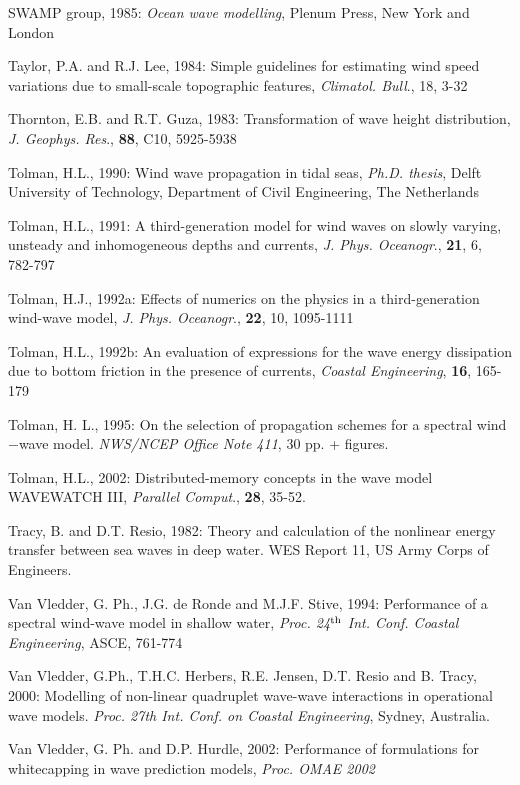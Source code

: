 \documentclass[12pt]{book}
\begin{document}
\begin{thebibliography}{10}
SWAMP group, 1985: {\it Ocean wave modelling}, Plenum Press, New York and London

Taylor, P.A. and R.J. Lee, 1984: Simple guidelines for estimating wind speed variations due to small-scale
topographic features, {\it Climatol. Bull}., 18, 3-32

Thornton, E.B. and R.T. Guza, 1983: Transformation of wave height distribution, {\it J. Geophys. Res}., {\bf 88},
C10, 5925-5938

Tolman, H.L., 1990: Wind wave propagation in tidal seas, {\it Ph.D. thesis}, Delft University of Technology,
Department of Civil Engineering, The Netherlands

Tolman, H.L., 1991: A third-generation model for wind waves on slowly varying, unsteady and
inhomogeneous depths and currents, {\it J. Phys. Oceanogr}., {\bf 21}, 6, 782-797

Tolman, H.J., 1992a: Effects of numerics on the physics in a third-generation wind-wave model, {\it J. Phys.
Oceanogr}., {\bf 22}, 10, 1095-1111

Tolman, H.L., 1992b: An evaluation of expressions for the wave energy dissipation due to bottom friction
in the presence of currents, {\it Coastal Engineering}, {\bf 16}, 165-179

Tolman, H. L., 1995: On the selection of propagation schemes for a spectral wind$-$wave model.
{\it NWS/NCEP Office Note 411}, 30 pp. + figures.

Tolman, H.L., 2002: Distributed-memory concepts in the wave model {WAVEWATCH III},
{\it Parallel Comput}., {\bf 28}, 35-52.

Tracy, B. and D.T. Resio, 1982: Theory and calculation of the nonlinear energy transfer between
sea waves in deep water. WES Report 11, US Army Corps of Engineers.

Van Vledder, G. Ph., J.G. de Ronde and M.J.F. Stive, 1994: Performance of a spectral wind-wave model
in shallow water, {\it Proc. 24$^{{\rm th}}$ Int. Conf. Coastal Engineering}, ASCE, 761-774

Van Vledder, G.Ph., T.H.C. Herbers, R.E. Jensen, D.T. Resio and B. Tracy, 2000: Modelling
of non-linear quadruplet wave-wave interactions in operational wave models. {\it Proc. 27th Int.
Conf. on Coastal Engineering}, Sydney, Australia.

Van Vledder, G. Ph. and D.P. Hurdle, 2002: Performance of formulations for whitecapping in wave
prediction models, {\it Proc. OMAE 2002}


\end{thebibliography}
\end{document}
